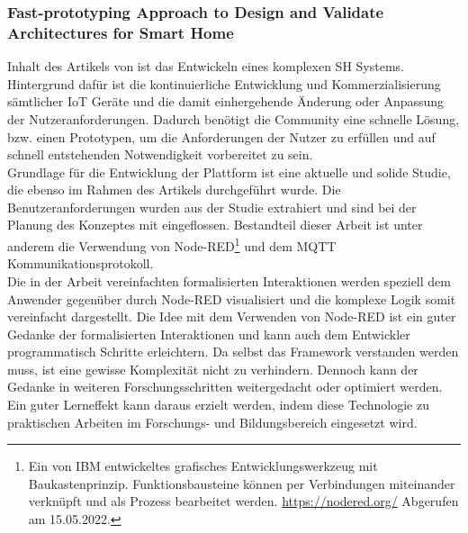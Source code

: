         \subsubsection*{Fast-prototyping Approach to Design and Validate Architectures for Smart Home}  
            Inhalt des Artikels von \cite{Montanaro2021} ist das Entwickeln eines komplexen \acl{SH} Systems. 
            Hintergrund dafür ist die kontinuierliche Entwicklung und Kommerzialisierung sämtlicher \acs{IoT} Geräte und 
            die damit einhergehende Änderung oder Anpassung der Nutzeranforderungen. Dadurch benötigt die Community eine 
            schnelle Lösung, bzw. einen Prototypen, um die Anforderungen der Nutzer zu erfüllen und auf schnell 
            entstehenden Notwendigkeit vorbereitet zu sein. 
            \\
            Grundlage für die Entwicklung der Plattform ist eine aktuelle und solide Studie, die ebenso im Rahmen des 
            Artikels durchgeführt wurde. Die Benutzeranforderungen wurden aus der Studie extrahiert und sind bei der 
            Planung des Konzeptes mit eingeflossen. Bestandteil dieser Arbeit ist unter anderem die Verwendung von Node-RED\footnote{Ein von IBM entwickeltes grafisches Entwicklungswerkzeug mit Baukastenprinzip. Funktionsbausteine können per Verbindungen miteinander verknüpft und als Prozess bearbeitet werden. \url{https://nodered.org/} Abgerufen am 15.05.2022.} und 
            dem \acs{MQTT} Kommunikationsprotokoll. 
            \\
            \linebreak
            Die in der Arbeit vereinfachten formalisierten Interaktionen werden speziell dem Anwender gegenüber durch 
            Node-RED visualisiert und die komplexe Logik somit vereinfacht dargestellt. Die Idee mit dem Verwenden von Node-RED 
            ist ein guter Gedanke der formalisierten Interaktionen und kann auch dem Entwickler programmatisch Schritte 
            erleichtern. Da selbst das Framework verstanden werden muss, ist eine gewisse Komplexität nicht zu verhindern. 
            Dennoch kann der Gedanke in weiteren Forschungsschritten weitergedacht oder optimiert werden. Ein guter Lerneffekt 
            kann daraus erzielt werden, indem diese Technologie zu praktischen Arbeiten im Forschungs- und Bildungsbereich 
            eingesetzt wird.
            
